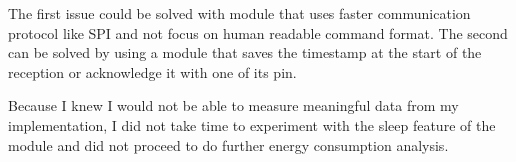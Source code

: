 The first issue could be solved with module that uses faster communication
protocol like SPI and not focus on human readable command format.
The second can be solved by using a module that saves the timestamp at the start
of the reception or acknowledge it with one of its pin.

Because I knew I would not be able to measure meaningful data from my
implementation, I did not take time to experiment with the sleep feature of the
module and did not proceed to do further energy consumption analysis.
